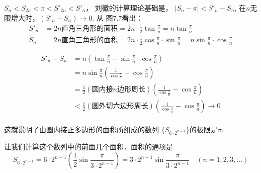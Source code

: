 $S_n<S_{2n}<\pi<S'_{2n}<S'_n$， 
刘徽的计算理论基础是，
$|S_n-\pi|<S'_n-S_n$, 在$n$无限增大时，$(S'_n-S_n)\to 0$. 从
图7.7看出：
\[\begin{split}
    S'_n&=2n\text{直角三角形的面积}=2n\cdot \frac{1}{2}\tan\frac{\pi}{n}=n\tan\frac{\pi}{n}   \\
    S_n&=2n\text{直角三角形的面积}=2n\cdot \frac{1}{2}\cos\frac{\pi}{n}\cdot \sin \frac{\pi}{n}=n\sin\frac{\pi}{n}\cdot \cos\frac{\pi}{n}
\end{split}\]

\[\begin{split}
    S'_n-S_n &= n\left(\tan\frac{\pi}{n}-\sin\frac{\pi}{n}\cdot \cos\frac{\pi}{n}\right)\\
    &=n \sin\frac{\pi}{n}\left(\frac{1}{\cos\frac{\pi}{n}}-\cos\frac{\pi}{n}\right)\\
    &=\frac{1}{2}(\text{圆内接$n$边形周长})\left(\frac{1}{\cos\frac{\pi}{n}}-\cos\frac{\pi}{n}\right)\\
    &<\frac{1}{2}(\text{圆外切六边形周长})\left(\frac{1}{\cos\frac{\pi}{n}}-\cos\frac{\pi}{n}\right)\to 0\\
\end{split} \]

这就说明了由圆内接正多边形的面积所组成的数列
$\{S_{6\cdot 2^{n-1}}\}$的极限是$\pi$. 

让我们计算这个数列中的前面几个面积．面积的通项是
\[S_{6\cdot 2^{n-1}}=6\cdot 2^{n-1}\left(\frac{1}{2}\sin\frac{\pi}{3\cdot 2^{n-1}}\right)=3\cdot 2^{n-1}\sin\frac{\pi}{3\cdot 2^{n-1}}\quad (n=1,2,3,\ldots)\]


